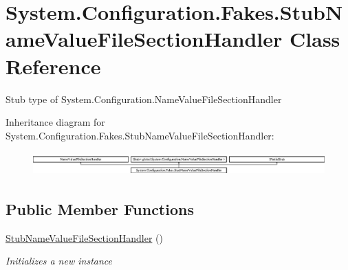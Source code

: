 \hypertarget{class_system_1_1_configuration_1_1_fakes_1_1_stub_name_value_file_section_handler}{\section{System.\-Configuration.\-Fakes.\-Stub\-Name\-Value\-File\-Section\-Handler Class Reference}
\label{class_system_1_1_configuration_1_1_fakes_1_1_stub_name_value_file_section_handler}
}


Stub type of System.\-Configuration.\-Name\-Value\-File\-Section\-Handler 


Inheritance diagram for System.\-Configuration.\-Fakes.\-Stub\-Name\-Value\-File\-Section\-Handler\-:\begin{figure}[H]
\begin{center}
\leavevmode
\includegraphics[height=0.917281cm]{class_system_1_1_configuration_1_1_fakes_1_1_stub_name_value_file_section_handler}
\end{center}
\end{figure}
\subsection*{Public Member Functions}
\begin{DoxyCompactItemize}
\item 
\hyperlink{class_system_1_1_configuration_1_1_fakes_1_1_stub_name_value_file_section_handler_a76c05c360cb70a043868d3738690cdc1}{Stub\-Name\-Value\-File\-Section\-Handler} ()
\begin{DoxyCompactList}\small\item\em Initializes a new instance\end{DoxyCompactList}\end{DoxyCompactItemize}
